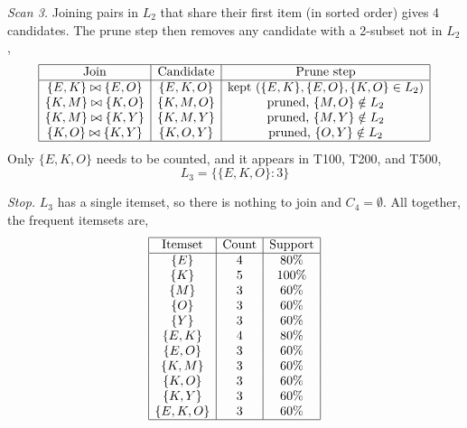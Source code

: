 \documentclass[12pt,letterpaper, onecolumn]{exam}
\begin{document}
\begin{questions}
\begin{solution}
\begin{enumerate}[a.)]
            \textit{Scan 3.} Joining pairs in $L_2$ that share their first item (in sorted order) gives 4 candidates. The prune step then removes any candidate with a 2-subset not in $L_2$,
            \begin{equation*}
                \begin{array}{|c|c|c|}
                    \hline \text{Join} & \text{Candidate} & \text{Prune step} \\ \hline
                    \{E,K\}\bowtie\{E,O\} & \{E,K,O\} & \text{kept (}\{E,K\},\{E,O\},\{K,O\}\in L_2) \\
                    \{K,M\}\bowtie\{K,O\} & \{K,M,O\} & \text{pruned, } \{M,O\}\notin L_2 \\
                    \{K,M\}\bowtie\{K,Y\} & \{K,M,Y\} & \text{pruned, } \{M,Y\}\notin L_2 \\
                    \{K,O\}\bowtie\{K,Y\} & \{K,O,Y\} & \text{pruned, } \{O,Y\}\notin L_2 \\ \hline
                \end{array}
            \end{equation*}
            Only $\{E,K,O\}$ needs to be counted, and it appears in T100, T200, and T500,
            \begin{equation*}
                L_3 = \{\{E,K,O\}:3\}
            \end{equation*}

            \textit{Stop.} $L_3$ has a single itemset, so there is nothing to join and $C_4=\emptyset$. All together, the frequent itemsets are,
            \begin{equation*}
                \begin{array}{|c|c|c|}
                    \hline \text{Itemset} & \text{Count} & \text{Support} \\ \hline
                    \{E\} & 4 & 80\% \\
                    \{K\} & 5 & 100\% \\
                    \{M\} & 3 & 60\% \\
                    \{O\} & 3 & 60\% \\
                    \{Y\} & 3 & 60\% \\
                    \{E,K\} & 4 & 80\% \\
                    \{E,O\} & 3 & 60\% \\
                    \{K,M\} & 3 & 60\% \\
                    \{K,O\} & 3 & 60\% \\
                    \{K,Y\} & 3 & 60\% \\
                    \{E,K,O\} & 3 & 60\% \\ \hline
                \end{array}
            \end{equation*}


\end{enumerate}
\end{solution}
\end{questions}
\end{document}

